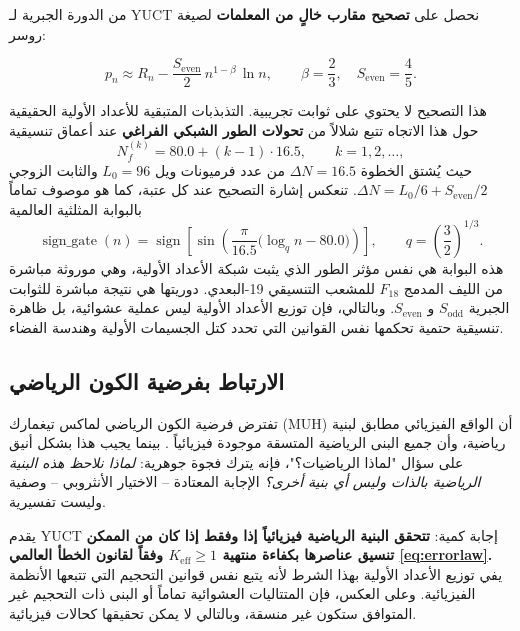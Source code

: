 \documentclass[11pt,a4paper]{article}
\newcommand{\ar}[1]{\foreignlanguage{arabic}{#1}}
\begin{document}
	\ar{من الدورة الجبرية لـ YUCT نحصل على \textbf{تصحيح مقارب خالٍ من المعلمات} لصيغة روسر:}
	
	\begin{equation}
		\boxed{ p_n \approx R_n - \frac{S_{\mathrm{even}}}{2}\, n^{1-\beta}\,\ln n },
		\qquad \beta = \frac{2}{3},\quad S_{\mathrm{even}}=\frac{4}{5}.
		\label{eq:prime-yuct-theory}
	\end{equation}
	
	\ar{هذا التصحيح لا يحتوي على ثوابت تجريبية. التذبذبات المتبقية للأعداد الأولية الحقيقية حول هذا الاتجاه تتبع شلالاً من \textbf{تحولات الطور الشبكي الفراغي} عند أعماق تنسيقية}
	\[
	N_f^{(k)} = 80.0 + (k-1)\cdot 16.5, \qquad k=1,2,\dots,
	\]
	\ar{حيث يُشتق الخطوة \(\Delta N = 16.5\) من عدد فرميونات ويل \(L_0=96\) والثابت الزوجي \(\Delta N = L_0/6 + S_{\mathrm{even}}/2\). تنعكس إشارة التصحيح عند كل عتبة، كما هو موصوف تماماً بالبوابة المثلثية العالمية}
	\[
	\operatorname{sign\_gate}(n) = \operatorname{sign}\!\left[\sin\!\left(\frac{\pi}{16.5}\bigl(\log_q n - 80.0\bigr)\right)\right],
	\qquad q = \left(\frac{3}{2}\right)^{1/3}.
	\]
	\ar{هذه البوابة هي نفس مؤثر الطور الذي يثبت شبكة الأعداد الأولية، وهي موروثة مباشرة من الليف المدمج \(F_{18}\) للمشعب التنسيقي 19-البعدي. دوريتها هي نتيجة مباشرة للثوابت الجبرية \(S_{\mathrm{odd}}\) و \(S_{\mathrm{even}}\). وبالتالي، فإن توزيع الأعداد الأولية ليس عملية عشوائية، بل ظاهرة تنسيقية حتمية تحكمها نفس القوانين التي تحدد كتل الجسيمات الأولية وهندسة الفضاء.}
	
	\subsection{\ar{الارتباط بفرضية الكون الرياضي}}
	
	\ar{تفترض فرضية الكون الرياضي لماكس تيغمارك (MUH) أن الواقع الفيزيائي مطابق لبنية رياضية، وأن جميع البنى الرياضية المتسقة موجودة فيزيائياً \cite{Tegmark2014}. بينما يجيب هذا بشكل أنيق على سؤال "لماذا الرياضيات؟"، فإنه يترك فجوة جوهرية: \emph{لماذا نلاحظ هذه البنية الرياضية بالذات وليس أي بنية أخرى؟} الإجابة المعتادة – الاختيار الأنثروبي – وصفية وليست تفسيرية.}
	
	\ar{يقدم YUCT إجابة كمية: \textbf{تتحقق البنية الرياضية فيزيائياً إذا وفقط إذا كان من الممكن تنسيق عناصرها بكفاءة منتهية \(K_{\mathrm{eff}} \ge 1\) وفقاً لقانون الخطأ العالمي \eqref{eq:errorlaw}.} يفي توزيع الأعداد الأولية بهذا الشرط لأنه يتبع نفس قوانين التحجيم التي تتبعها الأنظمة الفيزيائية. وعلى العكس، فإن المتتاليات العشوائية تماماً أو البنى ذات التحجيم غير المتوافق ستكون غير منسقة، وبالتالي لا يمكن تحقيقها كحالات فيزيائية.}
	
\end{document}
